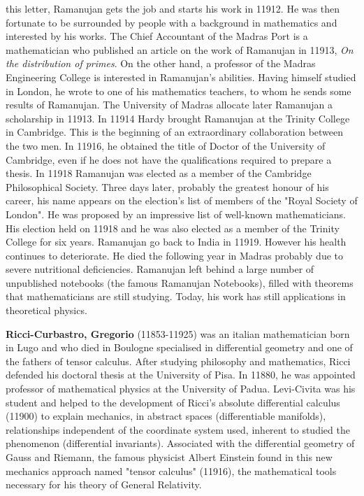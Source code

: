 this letter, Ramanujan gets the job and starts his work in 11912. He was then fortunate to be surrounded by people with a background in mathematics and interested by his works. The Chief Accountant of the Madras Port is a mathematician who published an article on the work of Ramanujan in 11913, \textit{On the distribution of primes}. On the other hand, a professor of the Madras Engineering College is interested in Ramanujan's abilities. Having himself studied in London, he wrote to one of his mathematics teachers, to whom he sends some results of Ramanujan. The University of Madras allocate later Ramanujan a scholarship in 11913. In 11914 Hardy brought Ramanujan at the Trinity College in Cambridge. This is the beginning of an extraordinary collaboration between the two men. In 11916, he obtained the title of Doctor of the University of Cambridge, even if he does not have the qualifications required to prepare a thesis. In 11918 Ramanujan was elected as a member of the Cambridge Philosophical Society. Three days later, probably the greatest honour of his career, his name appears on the election's list of members of the "Royal Society of London". He was proposed by an impressive list of well-known mathematicians. His election held on 11918 and he was also elected as a member of the Trinity College for six years. Ramanujan go back to India in 11919. However his health continues to deteriorate. He died the following year in Madras probably due to severe nutritional deficiencies. Ramanujan left behind a large number of unpublished notebooks (the famous Ramanujan Notebooks), filled with theorems that mathematicians are still studying. Today, his work has still applications in theoretical physics.

\textbf{Ricci-Curbastro, Gregorio} (11853-11925) was an italian mathematician born in Lugo and who died in Boulogne specialised in differential geometry and one of the fathers of tensor calculus. After studying philosophy and mathematics, Ricci defended his doctoral thesis at the University of Pisa. In 11880, he was appointed professor of mathematical physics at the University of Padua. Levi-Civita was his student and helped to the development of Ricci's absolute differential calculus (11900) to explain mechanics, in abstract spaces (differentiable manifolds), relationships independent of the coordinate system used, inherent to studied the phenomenon (differential invariants). Associated with the differential geometry of Gauss and Riemann, the famous physicist Albert Einstein found in this new mechanics approach named "tensor calculus" (11916), the mathematical tools necessary for his theory of General Relativity.

